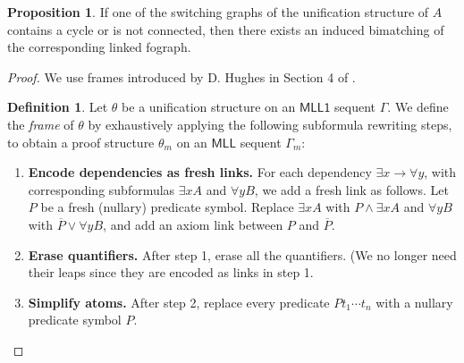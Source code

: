 \documentclass[conference,twosided,10pt]{IEEEtran}
\theoremstyle{definition}
\newtheorem{definition}[thm]{Definition}
\newtheorem{proposition}[thm]{Proposition}
\newcommand*{\MLL}{\mathsf{MLL}}
\newcommand*{\FOMLL}{\mathsf{MLL1}}
\begin{document}
\begin{proposition}
If one of the switching graphs of the unification structure of $A$
contains a cycle or is not connected, then there exists an induced bimatching of the
corresponding linked fograph.
\begin{proof}
We use frames introduced by D. Hughes in Section 4 of \cite{Hughes 2015}.

\begin{definition}
Let $\theta$ be a unification structure on an $\FOMLL$ sequent $\Gamma$.
We define the \textit{frame}  of $\theta$ by exhaustively applying the following subformula rewriting steps, to obtain a proof structure $\theta_m$ on an $\MLL$ sequent $\Gamma_m$:

\begin{enumerate}
  \item {\bf Encode dependencies as fresh links.} For each dependency $\exists x
	  \rightarrow \forall y$, with corresponding subformulas $\exists x A$
		and $\forall y B$, we add a fresh link as follows. Let $P$ be a
		fresh (nullary) predicate symbol. Replace $\exists x A$ with $P
		\wedge \exists x A$ and $\forall y B$ with $\overline{P} \vee \forall y B$, and add an axiom link between $P$ and $\overline{P}$.
  \item {\bf Erase quantifiers.} After step 1, erase all the quantifiers. (We no longer need their leaps since they are encoded as links in step 1.
  \item {\bf Simplify atoms.} After step 2, replace every predicate $Pt_1 \cdots t_n$ with a nullary predicate symbol $P$.
\end{enumerate}
\end{definition}

\begin{center}
\vspace{0.5cm}


\end{center}
\end{proof}
\end{proposition}
\end{document}
